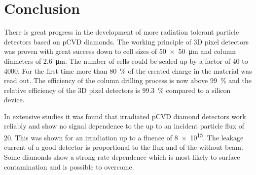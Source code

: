 \section{Conclusion}
There is great progress in the development of more radiation tolerant particle detectors based on \ac{pCVD} diamonds. The working principle of 3D pixel detectors was proven with great success down to cell sizes of \SI{50x50}{\micro\meter} and column diameters of \SI{2.6}{\micro\meter}. The number of cells could be scaled up by a factor of 40 to 4000. For the first time more than \SI{80}{\%} of the created charge in the material was read out. The efficiency of the column drilling process is now above \SI{99}{\%} and the relative efficiency of the 3D pixel detectors is \SI{99.3}{\%} compared to a silicon device.\par
In extensive studies it was found that irradiated \ac{pCVD} diamond detectors work reliably and show no signal dependence to the  up to an incident particle flux of \SI{20}{\mhzcm}. This was shown for an irradiation  up to a fluence of \SI{8e15}{\ncm}. The leakage current of a good detector is proportional to the flux and of the  without beam. Some diamonds show a strong rate dependence which is most likely to surface contamination and is possible to overcome.
